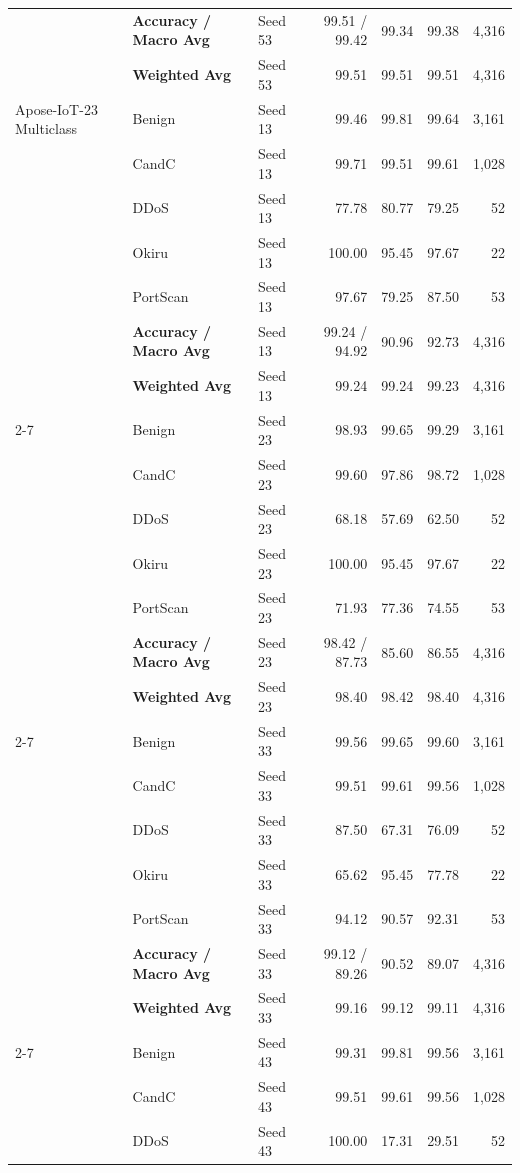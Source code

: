 \documentclass[a4paper,fleqn]{cas-sc}
\begin{document}
{\begin{landscape}
\begin{longtable}{lllrrrr}
 & \textbf{Accuracy / Macro Avg} & Seed 53 & 99.51 / 99.42 & 99.34 & 99.38 & 4,316 \\
 & \textbf{Weighted Avg} & Seed 53 & 99.51 & 99.51 & 99.51 & 4,316 \\
\midrule
Apose-IoT-23 Multiclass & Benign & Seed 13 & 99.46 & 99.81 & 99.64 & 3,161 \\
 & CandC & Seed 13 & 99.71 & 99.51 & 99.61 & 1,028 \\
 & DDoS & Seed 13 & 77.78 & 80.77 & 79.25 & 52 \\
 & Okiru & Seed 13 & 100.00 & 95.45 & 97.67 & 22 \\
 & PortScan & Seed 13 & 97.67 & 79.25 & 87.50 & 53 \\
 & \textbf{Accuracy / Macro Avg} & Seed 13 & 99.24 / 94.92 & 90.96 & 92.73 & 4,316 \\
 & \textbf{Weighted Avg} & Seed 13 & 99.24 & 99.24 & 99.23 & 4,316 \\
\cline{2-7}
 & Benign & Seed 23 & 98.93 & 99.65 & 99.29 & 3,161 \\
 & CandC & Seed 23 & 99.60 & 97.86 & 98.72 & 1,028 \\
 & DDoS & Seed 23 & 68.18 & 57.69 & 62.50 & 52 \\
 & Okiru & Seed 23 & 100.00 & 95.45 & 97.67 & 22 \\
 & PortScan & Seed 23 & 71.93 & 77.36 & 74.55 & 53 \\
 & \textbf{Accuracy / Macro Avg} & Seed 23 & 98.42 / 87.73 & 85.60 & 86.55 & 4,316 \\
 & \textbf{Weighted Avg} & Seed 23 & 98.40 & 98.42 & 98.40 & 4,316 \\
\cline{2-7}
 & Benign & Seed 33 & 99.56 & 99.65 & 99.60 & 3,161 \\
 & CandC & Seed 33 & 99.51 & 99.61 & 99.56 & 1,028 \\
 & DDoS & Seed 33 & 87.50 & 67.31 & 76.09 & 52 \\
 & Okiru & Seed 33 & 65.62 & 95.45 & 77.78 & 22 \\
 & PortScan & Seed 33 & 94.12 & 90.57 & 92.31 & 53 \\
 & \textbf{Accuracy / Macro Avg} & Seed 33 & 99.12 / 89.26 & 90.52 & 89.07 & 4,316 \\
 & \textbf{Weighted Avg} & Seed 33 & 99.16 & 99.12 & 99.11 & 4,316 \\
\cline{2-7}
 & Benign & Seed 43 & 99.31 & 99.81 & 99.56 & 3,161 \\
 & CandC & Seed 43 & 99.51 & 99.61 & 99.56 & 1,028 \\
 & DDoS & Seed 43 & 100.00 & 17.31 & 29.51 & 52 \\

\end{longtable}
\end{landscape}}
\end{document}
